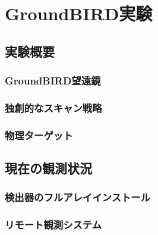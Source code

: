 \chapter{GroundBIRD実験}

\section{実験概要}

\subsection{GroundBIRD望遠鏡}

\subsection{独創的なスキャン戦略}

\subsection{物理ターゲット}

\section{現在の観測状況}

\subsection{検出器のフルアレイインストール}

\subsection{リモート観測システム}
